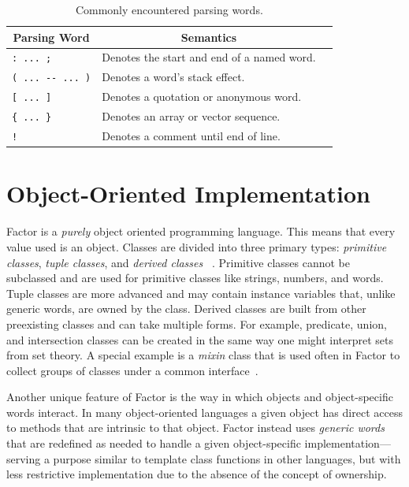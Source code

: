 \documentclass[sigconf]{acmart}
\begin{document}
\begin{table}
  \caption{Commonly encountered parsing words.}
  \begin{tabular}{lll}
    \toprule
    \multicolumn{1}{c}{\textbf{Parsing Word}} &
    \multicolumn{1}{c}{\textbf{Semantics}} \\
    \midrule
     \verb|: ... ;|&Denotes the start and end of a named word.\\
          \verb|( ... -- ... )|&Denotes a word's stack effect.\\
	 \verb|[ ... ]|&Denotes a quotation or anonymous word.\\
     \verb|{ ... }|&Denotes an array or vector sequence.\\
     \verb|!|&Denotes a comment until end of line.\\
  \bottomrule
\end{tabular}
\label{tab:parsewords}
\end{table}

\section{Object-Oriented Implementation}
Factor is a \textit{purely} object oriented programming 
language. This means that every value used is an object. Classes
are divided into three primary types: \textit{primitive classes},
\textit{tuple classes}, and \textit{derived classes}
~\cite{pestov:Factor}. Primitive classes cannot be subclassed
and are used for primitive classes like strings, numbers, and 
words. Tuple classes are more advanced and may contain instance 
variables that, unlike generic words, are owned by the class. 
Derived classes are built from other preexisting classes and 
can take multiple forms. For example, predicate, union, and 
intersection classes can be created in the same way one might 
interpret sets from set theory. A special example is a 
\textit{mixin} class that is used often in Factor to collect 
groups of classes under a common interface~\cite{pestov:Factor}.

Another unique feature of Factor is the way in which objects
and object-specific words interact. In many object-oriented 
languages a given object has direct access to methods that are
intrinsic to that object. Factor instead uses \textit{generic 
words} that are redefined as needed to handle a given 
object-specific implementation---serving a purpose similar to 
template class functions in other languages, but with less 
restrictive implementation due to the absence of the concept 
of ownership.
\end{document}
